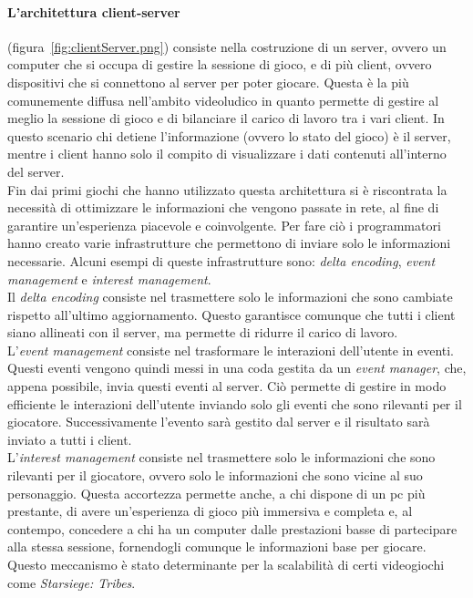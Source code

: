         \paragraph{L'architettura client-server} (figura~\ref{fig:clientServer.png}) consiste nella costruzione di un server, ovvero un computer che si occupa di gestire la sessione di 
            gioco, e di più client, ovvero dispositivi che si connettono al server per poter giocare. Questa è la più comunemente diffusa nell'ambito videoludico in quanto permette 
            di gestire al meglio la sessione di gioco e di bilanciare il carico di lavoro tra i vari client. In questo scenario chi detiene l'informazione (ovvero lo stato del gioco) 
            è il server, mentre i client hanno solo il compito di visualizzare i dati contenuti all'interno del server.\\ 
            Fin dai primi giochi che hanno utilizzato questa architettura
            si è riscontrata la necessità di ottimizzare le informazioni che vengono passate in rete, al fine di garantire un'esperienza piacevole e coinvolgente. Per fare ciò i 
            programmatori hanno creato varie infrastrutture che permettono di inviare solo le informazioni necessarie. Alcuni esempi di queste infrastrutture sono: 
            \textit{delta encoding}, \textit{event management} e \textit{interest management}.\\
            Il \textit{delta encoding} consiste nel trasmettere solo le informazioni che sono cambiate rispetto all'ultimo aggiornamento. Questo garantisce comunque che tutti
            i client siano allineati con il server, ma permette di ridurre il carico di lavoro.\\
            L'\textit{event management} consiste nel trasformare le interazioni dell'utente in eventi. Questi eventi vengono quindi messi in una coda gestita da un 
            \textit{event manager}, che, appena possibile, invia questi eventi al server. Ciò permette di gestire in modo efficiente le interazioni dell'utente inviando
            solo gli eventi che sono rilevanti per il giocatore. Successivamente l'evento sarà gestito dal server e il risultato sarà inviato a tutti i client.\\
            L'\textit{interest management} consiste nel trasmettere solo le informazioni che sono rilevanti per il giocatore, ovvero solo le informazioni che sono vicine al suo 
            personaggio. Questa accortezza permette anche, a chi dispone di un pc più prestante, di avere un'esperienza di gioco più immersiva e completa e, al contempo, concedere 
            a chi ha un computer dalle prestazioni basse di partecipare alla stessa sessione, fornendogli comunque le informazioni base per giocare. Questo meccanismo è stato
            determinante per la scalabilità di certi videogiochi come \textit{Starsiege: Tribes}.\\

